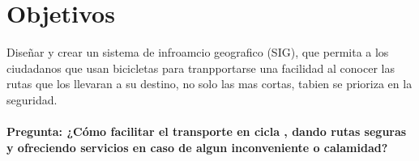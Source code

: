 \section{Objetivos}

Diseñar y crear un sistema de infroamcio geografico (SIG), que permita a los ciudadanos que usan bicicletas para tranpportarse una facilidad al conocer las rutas que los llevaran a su destino, no solo las mas cortas, tabien se prioriza en la seguridad.
\\
\\
\textbf{Pregunta: ¿Cómo facilitar el transporte en cicla , dando rutas seguras y ofreciendo servicios en caso de algun inconveniente o calamidad?}
\\
\\